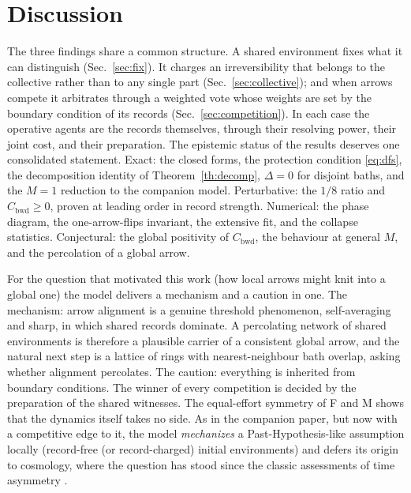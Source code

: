 \documentclass[11pt]{article}
\newcommand{\Cbwd}{C_{\mathrm{bwd}}}
\begin{document}
\section{Discussion}\label{sec:discussion}

The three findings share a common structure. A shared environment fixes what it can distinguish (Sec.~\ref{sec:fix}). It charges an irreversibility that belongs to the collective rather than to any single part (Sec.~\ref{sec:collective}); and when arrows compete it arbitrates through a weighted vote whose weights are set by the boundary condition of its records (Sec.~\ref{sec:competition}). In each case the operative agents are the records themselves, through their resolving power, their joint cost, and their preparation. The epistemic status of the results deserves one consolidated statement. Exact: the closed forms, the protection condition \eqref{eq:dfs}, the decomposition identity of Theorem~\ref{th:decomp}, $\Delta=0$ for disjoint baths, and the $M{=}1$ reduction to the companion model. Perturbative: the $1/8$ ratio and $\Cbwd\ge0$, proven at leading order in record strength. Numerical: the phase diagram, the one-arrow-flips invariant, the extensive fit, and the collapse statistics. Conjectural: the global positivity of $\Cbwd$, the behaviour at general $M$, and the percolation of a global arrow.

For the question that motivated this work (how local arrows might knit into a global one) the model delivers a mechanism and a caution in one. The mechanism: arrow alignment is a genuine threshold phenomenon, self-averaging and sharp, in which shared records dominate. A percolating network of shared environments is therefore a plausible carrier of a consistent global arrow, and the natural next step is a lattice of rings with nearest-neighbour bath overlap, asking whether alignment percolates. The caution: everything is inherited from boundary conditions. The winner of every competition is decided by the preparation of the shared witnesses. The equal-effort symmetry of F and M shows that the dynamics itself takes no side. As in the companion paper, but now with a competitive edge to it, the model \emph{mechanizes} a Past-Hypothesis-like assumption locally (record-free (or record-charged) initial environments) and defers its origin to cosmology, where the question has stood since the classic assessments of time asymmetry \cite{Halliwell1994}.
\end{document}
